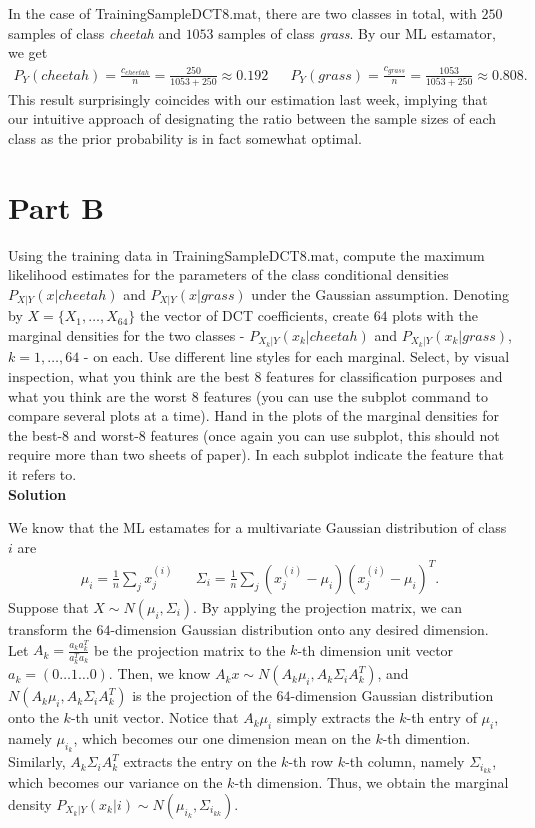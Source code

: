 \documentclass{article}
\begin{document}
In the case of {\selectfont TrainingSampleDCT\textunderscore8.mat}, there are two classes in total, with $250$ samples of class \textit{cheetah} and $1053$ samples of class \textit{grass}.
By our ML estamator, we get
\begin{align*}
  P_Y(cheetah) = \frac{c_{cheetah}}{n} = \frac{250}{1053 + 250} \approx 0.192 && P_Y(grass) = \frac{c_{grass}}{n} = \frac{1053}{1053 + 250} \approx 0.808.
\end{align*}
This result surprisingly coincides with our estimation last week, implying that our intuitive approach of designating the ratio between the sample sizes of each class as the prior probability is in fact somewhat optimal.

\pagebreak

\section*{Part B}

Using the training data in {\selectfont TrainingSampleDCT\textunderscore8.mat}, compute the maximum likelihood estimates
for the parameters of the class conditional densities $P_{X|Y}(x|cheetah)$ and $P_{X|Y}(x|grass)$ under the
Gaussian assumption. Denoting by $X = \{X_1,\dots, X_{64}\}$ the vector of DCT coefficients, create $64$ plots
with the marginal densities for the two classes - $P_{X_k|Y} (x_k|cheetah)$ and $P_{X_k|Y} (x_k|grass)$, $k = 1,\dots, 64$
- on each. Use different line styles for each marginal. Select, by visual inspection, what you think are
the best $8$ features for classification purposes and what you think are the worst $8$ features (you can use
the subplot command to compare several plots at a time). Hand in the plots of the marginal densities
for the best-8 and worst-8 features (once again you can use subplot, this should not require more than
two sheets of paper). In each subplot indicate the feature that it refers to.
\\

\textbf{\large Solution}

We know that the ML estamates for a multivariate Gaussian distribution of class $i$ are
\begin{align*}
  \mu_i = \frac{1}{n}\sum_j x^{(i)}_j && \Sigma_i = \frac{1}{n}\sum_j (x^{(i)}_j - \mu_i)(x^{(i)}_j - \mu_i)^T.
\end{align*}
Suppose that $X \sim N(\mu_i, \Sigma_i)$. By applying the projection matrix, we can transform the $64$-dimension Gaussian distribution onto any desired dimension.
Let $A_k = \frac{a_ka_k^T}{a_k^Ta_k}$ be the projection matrix to the $k$-th dimension unit vector $a_k = (0 \dots 1 \dots 0)$.
Then, we know $A_kx \sim N(A_k\mu_i, A_k\Sigma_iA_k^T)$, and $N(A_k\mu_i, A_k\Sigma_iA_k^T)$ is the projection of the $64$-dimension Gaussian distribution onto the $k$-th unit vector.
Notice that $A_k\mu_i$ simply extracts the $k$-th entry of $\mu_i$, namely $\mu_{i_k}$, which becomes our one dimension mean on the $k$-th dimention. 
Similarly, $A_k\Sigma_iA_k^T$ extracts the entry on the $k$-th row $k$-th column, namely $\Sigma_{i_{kk}}$, which becomes our variance on the $k$-th dimension.
Thus, we obtain the marginal density $P_{X_k|Y}(x_k|i) \sim N(\mu_{i_k}, \Sigma_{i_{kk}})$.
\end{document}
